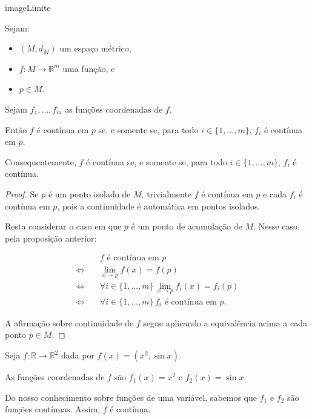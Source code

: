 {imageLimite}


\begin{corollary}
    Sejam:
    \begin{itemize}
        \item $(M, d_M)$ um espaço métrico,
        \item $f: M \to \mathbb R^m$ uma função, e
        \item $p \in M$.
    \end{itemize}

    Sejam $f_1, \dots, f_m$ as funções coordenadas de $f$.

    Então $f$ é contínua em $p$ se, e somente se, para todo $i \in \{1, \dots, m\}$, $f_i$ é contínua em $p$.

    Consequentemente, $f$ é contínua se, e somente se, para todo $i \in \{1, \dots, m\}$, $f_i$ é contínua.
\end{corollary}

\begin{proof}
    Se $p$ é um ponto isolado de $M$, trivialmente $f$ é contínua em $p$ e cada $f_i$ é contínua em $p$, pois a continuidade é automática em pontos isolados.

    Resta considerar o caso em que $p$ é um ponto de acumulação de $M$.
    Nesse caso, pela proposição anterior:

    \begin{align*}
        & f \text{ é contínua em } p \\
        \Leftrightarrow\quad & \lim_{x\to p} f(x) = f(p) \\
        \Leftrightarrow\quad & \forall i \in \{1, \dots, m\}\, \lim_{x\to p} f_i(x) = f_i(p) \\
        \Leftrightarrow\quad & \forall i \in \{1, \dots, m\}\, f_i \text{ é contínua em } p.
    \end{align*}

    A afirmação sobre continuidade de $f$ segue aplicando a equivalência acima a cada ponto $p\in M$.
\end{proof}

\begin{example}
    Seja $f:\mathbb R\to \mathbb R^2$ dada por $f(x)=(x^2, \sin x)$.

    As funções coordenadas de $f$ são $f_1(x)=x^2$ e $f_2(x)=\sin x$.

    Do nosso conhecimento sobre funções de uma variável, sabemos que $f_1$ e $f_2$ são funções contínuas.
    Assim, $f$ é contínua.
\end{example}

